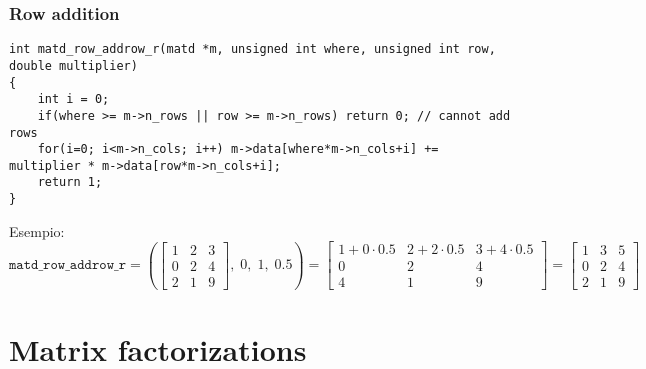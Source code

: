 \documentclass[10pt]{article}
\begin{document}
\subsubsection{Row addition}

\begin{lstlisting}
int matd_row_addrow_r(matd *m, unsigned int where, unsigned int row, double multiplier)
{
	int i = 0;
	if(where >= m->n_rows || row >= m->n_rows) return 0; // cannot add rows
	for(i=0; i<m->n_cols; i++) m->data[where*m->n_cols+i] += multiplier * m->data[row*m->n_cols+i];
	return 1;
}
\end{lstlisting}

Esempio:
\begin{equation*}
\mathtt{matd\_row\_addrow\_r} = \left( 
\begin{bmatrix}
1 & 2 & 3 \\ 0 & 2 & 4 \\ 2 & 1 & 9
\end{bmatrix}, \; 0, \; 1, \; 0.5
\right) = 
\begin{bmatrix}
1+0\cdot 0.5 & 2+2\cdot 0.5 & 3+4\cdot 0.5 \\
0 & 2 & 4 \\
4 & 1 & 9
\end{bmatrix} = 
\begin{bmatrix}
1 & 3 & 5 \\ 0 & 2 & 4 \\ 2 & 1 & 9
\end{bmatrix}
\end{equation*}



\section{Matrix factorizations}
\end{document}
